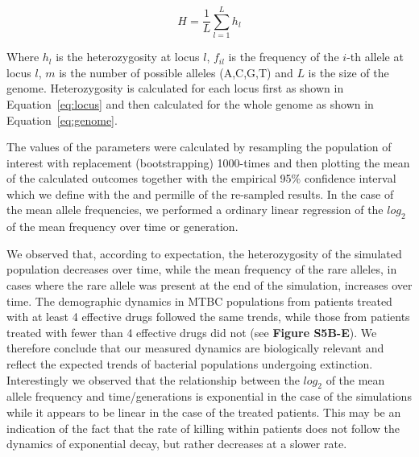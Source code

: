 \documentclass[12pt, oneside]{article}   	%
\begin{document}
\begin{equation} \label{eq:genome}
H = \frac{1}{L}\sum^L_{l=1}h_l
\end{equation}

Where $h_l$ is the heterozygosity at locus $l$, $f_{il}$ is the frequency of the $i$-th allele at locus $l$, $m$ is the number of possible alleles (A,C,G,T) and $L$ is the size of the genome. Heterozygosity is calculated for each locus first as shown in Equation~\ref{eq:locus} and then calculated for the whole genome as shown in Equation~\ref{eq:genome}.

The values of the parameters were calculated by resampling the population of interest with replacement (bootstrapping) 1000-times and then plotting the mean of the calculated outcomes together with the empirical 95\% confidence interval which we define with the  and  permille of the re-sampled results. In the case of the mean allele frequencies, we performed a ordinary linear regression of the $log_2$ of the mean frequency over time or generation.

We observed that, according to expectation, the heterozygosity of the simulated population decreases over time, while the mean frequency of the rare alleles, in cases where the rare allele was present at the end of the simulation, increases over time. The demographic dynamics in MTBC populations from patients treated with at least 4 effective drugs followed the same trends, while those from patients treated with fewer than 4 effective drugs did not (see \textbf{Figure S5B-E}). We therefore conclude that our measured dynamics are biologically relevant and reflect the expected trends of bacterial populations undergoing extinction. Interestingly we observed that the relationship between the $log_2$ of the mean allele frequency and time/generations is exponential in the case of the simulations while it appears to be linear in the case of the treated patients. This may be an indication of the fact that the rate of killing within patients does not follow the dynamics of exponential decay, but rather decreases at a slower rate.
\end{document}
